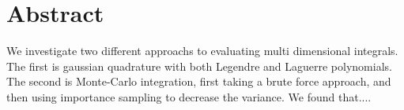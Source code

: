 \section*{Abstract}

We investigate two different approachs to evaluating multi dimensional
integrals. The first is gaussian quadrature with both Legendre and Laguerre
polynomials. The second is Monte-Carlo integration, first taking a brute force
approach, and then using importance sampling to decrease the variance.
We found that....
